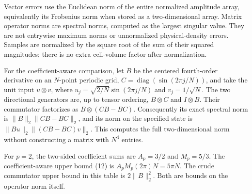 Vector errors use the Euclidean norm of the entire normalized amplitude
array, equivalently its Frobenius norm when stored as a two-dimensional
array. Matrix operator norms are spectral norms, computed as the largest
singular value. They are not entrywise maximum norms or unnormalized
physical-density errors. Samples are normalized by the square root of
the sum of their squared magnitudes; there is no extra cell-volume
factor after normalization.

For the coefficient-aware comparison, let \(B\) be the centered
fourth-order derivative on an \(N\)-point periodic grid,
\(C=\operatorname{diag}(\sin(2\pi j/N))\), and take the unit input
\(u\otimes v\), where \(u_j=\sqrt{2/N}\sin(2\pi j/N)\) and
\(v_j=1/\sqrt N\). The two directional generators are, up to tensor
ordering, \(B\otimes C\) and \(I\otimes B\). Their commutator factorizes
as \(B\otimes(CB-BC)\). Consequently its exact spectral norm is
\(\|B\|_2\|CB-BC\|_2\), and its norm on the specified state is
\(\|Bu\|_2\|(CB-BC)v\|_2\). This computes the full two-dimensional norm
without constructing a matrix with \(N^4\) entries.

For \(p=2\), the two-sided coefficient sums are \(A_p=3/2\) and
\(M_p=5/3\). The coefficient-aware upper bound (12) is
\(A_pM_p(2\pi)N=5\pi N\). The crude commutator upper bound in this table
is \(2\|B\|_2^2\). Both are bounds on the operator norm itself.

